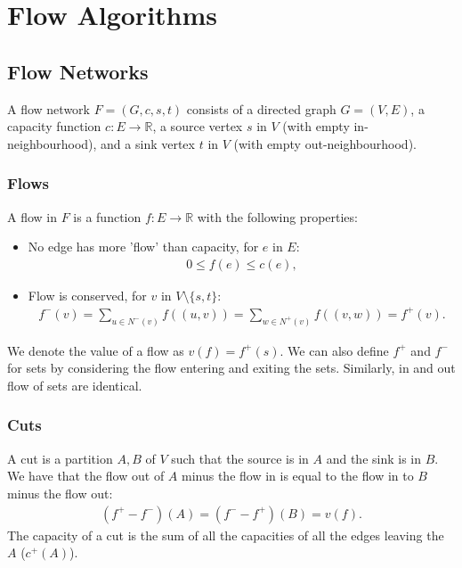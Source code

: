 \section{Flow Algorithms}

\subsection{Flow Networks}

A flow network $F = (G, c, s, t)$ consists of a directed graph $G = (V, E)$, a capacity function
$c : E \to \mathbb{R}$, a source vertex $s$ in $V$ (with empty in-neighbourhood), and a sink
vertex $t$ in $V$ (with empty out-neighbourhood).

\subsubsection{Flows}

A flow in $F$ is a function $f : E \to \mathbb{R}$ with the following properties: \begin{itemize}
  \item No edge has more 'flow' than capacity, for $e$ in $E$: \begin{gather*}
    0 \leq f(e) \leq c(e),
  \end{gather*}
  \item Flow is conserved, for $v$ in $V \setminus \{s, t\}$: \begin{gather*}
    f^-(v) = \sum_{u \in N^-(v)} f((u, v)) = \sum_{w \in N^+(v)} f((v, w)) = f^+(v).
  \end{gather*}
\end{itemize} We denote the value of a flow as $v(f) = f^+(s)$. We can also define $f^+$ and $f^-$
for sets by considering the flow entering and exiting the sets. Similarly, in and out flow
of sets are identical.

\subsubsection{Cuts}

A cut is a partition $A, B$ of $V$ such that the source is in $A$ and the sink is in $B$.
We have that the flow out of $A$ minus the flow in is equal to the flow in 
to $B$ minus the flow out:
\begin{gather*}
  (f^+ - f^-)(A) = (f^- - f^+)(B) = v(f).
\end{gather*} The capacity of a cut is the sum of all the capacities of all
the edges leaving the $A$ ($c^+(A)$).


